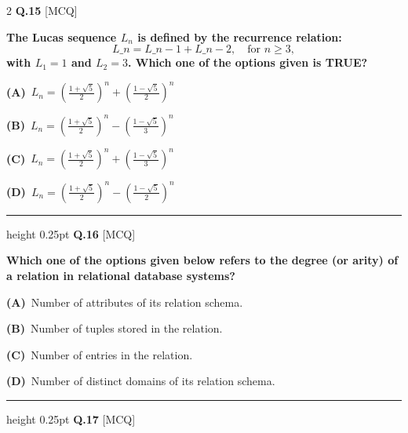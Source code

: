 \documentclass[a4paper,10pt,twoside]{article}
\begin{document}
\begin{multicols}{2}
\noindent\textbf{Q.15} \hfill {\footnotesize\textsf{[MCQ]}}
\par\vspace{2pt}
{\bfseries The Lucas sequence $L_n$ is defined by the recurrence relation:
\[ L\_n = L\_{n-1} + L\_{n-2}, \quad \text{for } n \ge 3, \]
with $L_1 = 1$ and $L_2 = 3$.
Which one of the options given is TRUE? \par}
\par\vspace{2pt}\noindent
\textbf{(A)}~$L_n = \left(\frac{1+\sqrt{5}}{2}\right)^n + \left(\frac{1-\sqrt{5}}{2}\right)^n$\par\vspace{2pt}\noindent
\textbf{(B)}~$L_n = \left(\frac{1+\sqrt{5}}{2}\right)^n - \left(\frac{1-\sqrt{5}}{3}\right)^n$\par\vspace{2pt}\noindent
\textbf{(C)}~$L_n = \left(\frac{1+\sqrt{5}}{2}\right)^n + \left(\frac{1-\sqrt{5}}{3}\right)^n$\par\vspace{2pt}\noindent
\textbf{(D)}~$L_n = \left(\frac{1+\sqrt{5}}{2}\right)^n - \left(\frac{1-\sqrt{5}}{2}\right)^n$
\par\vspace{6pt}\hrule height 0.25pt\vspace{6pt}
\noindent\textbf{Q.16} \hfill {\footnotesize\textsf{[MCQ]}}
\par\vspace{2pt}
{\bfseries Which one of the options given below refers to the degree (or arity) of a relation in relational database systems? \par}
\par\vspace{2pt}\noindent
\textbf{(A)}~Number of attributes of its relation schema.\par\vspace{2pt}\noindent
\textbf{(B)}~Number of tuples stored in the relation.\par\vspace{2pt}\noindent
\textbf{(C)}~Number of entries in the relation.\par\vspace{2pt}\noindent
\textbf{(D)}~Number of distinct domains of its relation schema.
\par\vspace{6pt}\hrule height 0.25pt\vspace{6pt}
\noindent\textbf{Q.17} \hfill {\footnotesize\textsf{[MCQ]}}
\par\vspace{2pt}

\end{multicols}
\end{document}
